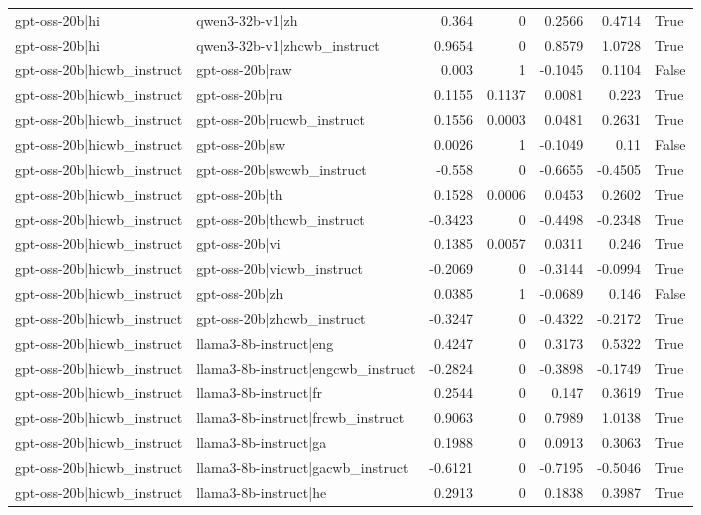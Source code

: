 \begin{table}
\begin{tabular}{l l r r r r l}
gpt-oss-20b|hi & qwen3-32b-v1|zh & 0.364 & 0 & 0.2566 & 0.4714 & True \\
gpt-oss-20b|hi & qwen3-32b-v1|zhcwb_instruct & 0.9654 & 0 & 0.8579 & 1.0728 & True \\
gpt-oss-20b|hicwb_instruct & gpt-oss-20b|raw & 0.003 & 1 & -0.1045 & 0.1104 & False \\
gpt-oss-20b|hicwb_instruct & gpt-oss-20b|ru & 0.1155 & 0.1137 & 0.0081 & 0.223 & True \\
gpt-oss-20b|hicwb_instruct & gpt-oss-20b|rucwb_instruct & 0.1556 & 0.0003 & 0.0481 & 0.2631 & True \\
gpt-oss-20b|hicwb_instruct & gpt-oss-20b|sw & 0.0026 & 1 & -0.1049 & 0.11 & False \\
gpt-oss-20b|hicwb_instruct & gpt-oss-20b|swcwb_instruct & -0.558 & 0 & -0.6655 & -0.4505 & True \\
gpt-oss-20b|hicwb_instruct & gpt-oss-20b|th & 0.1528 & 0.0006 & 0.0453 & 0.2602 & True \\
gpt-oss-20b|hicwb_instruct & gpt-oss-20b|thcwb_instruct & -0.3423 & 0 & -0.4498 & -0.2348 & True \\
gpt-oss-20b|hicwb_instruct & gpt-oss-20b|vi & 0.1385 & 0.0057 & 0.0311 & 0.246 & True \\
gpt-oss-20b|hicwb_instruct & gpt-oss-20b|vicwb_instruct & -0.2069 & 0 & -0.3144 & -0.0994 & True \\
gpt-oss-20b|hicwb_instruct & gpt-oss-20b|zh & 0.0385 & 1 & -0.0689 & 0.146 & False \\
gpt-oss-20b|hicwb_instruct & gpt-oss-20b|zhcwb_instruct & -0.3247 & 0 & -0.4322 & -0.2172 & True \\
gpt-oss-20b|hicwb_instruct & llama3-8b-instruct|eng & 0.4247 & 0 & 0.3173 & 0.5322 & True \\
gpt-oss-20b|hicwb_instruct & llama3-8b-instruct|engcwb_instruct & -0.2824 & 0 & -0.3898 & -0.1749 & True \\
gpt-oss-20b|hicwb_instruct & llama3-8b-instruct|fr & 0.2544 & 0 & 0.147 & 0.3619 & True \\
gpt-oss-20b|hicwb_instruct & llama3-8b-instruct|frcwb_instruct & 0.9063 & 0 & 0.7989 & 1.0138 & True \\
gpt-oss-20b|hicwb_instruct & llama3-8b-instruct|ga & 0.1988 & 0 & 0.0913 & 0.3063 & True \\
gpt-oss-20b|hicwb_instruct & llama3-8b-instruct|gacwb_instruct & -0.6121 & 0 & -0.7195 & -0.5046 & True \\
gpt-oss-20b|hicwb_instruct & llama3-8b-instruct|he & 0.2913 & 0 & 0.1838 & 0.3987 & True \\

\end{tabular}
\end{table}
